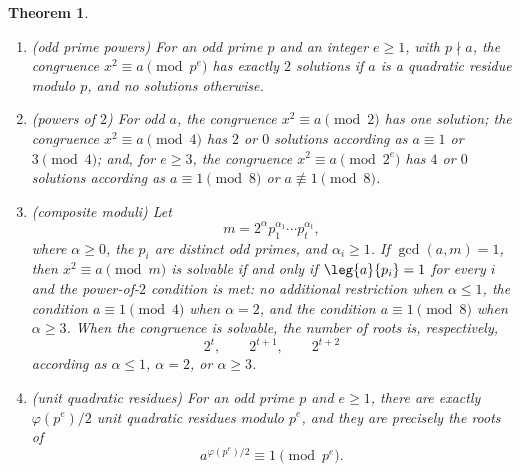 \documentclass[11pt]{article}
\theoremstyle{ntstyle}
\newtheorem{theorem}{Theorem}[subsection]
\newcommand{\statementitems}{\mbox{}}
\begin{document}
\begin{theorem}\label{thm:7.8.4}\statementitems

	\begin{enumerate}[label={\alph*)}]
		\item (odd prime powers) For an odd prime $p$ and an integer $e\ge1$,
		      with $p\nmid a$, the congruence
		      $x^2\equiv a\pmod{p^e}$ has exactly $2$ solutions if $a$ is a
		      quadratic residue modulo $p$, and no solutions otherwise.
		\item (powers of $2$) For odd $a$, the congruence
		      $x^2\equiv a\pmod2$ has one solution;
		      the congruence $x^2\equiv a\pmod4$ has $2$ or $0$ solutions according as
		      $a\equiv1$ or $3\pmod4$; and, for $e\ge3$,
		      the congruence $x^2\equiv a\pmod{2^e}$ has $4$ or $0$ solutions according as
		      $a\equiv1\pmod8$ or $a\not\equiv1\pmod8$.
		\item (composite moduli) Let
		      \[
			      m=2^\alpha p_1^{\alpha_1}\cdots p_t^{\alpha_t},
		      \]
		      where $\alpha\ge0$, the $p_i$ are distinct odd primes, and
		      $\alpha_i\ge1$. If $\gcd(a,m)=1$, then
		      $x^2\equiv a\pmod m$ is solvable if and only if
		      $\leg{a}{p_i}=1$ for every $i$ and the power-of-$2$ condition is met:
		      no additional restriction when $\alpha\le1$,
		      the condition $a\equiv1\pmod4$ when $\alpha=2$, and
		      the condition $a\equiv1\pmod8$ when $\alpha\ge3$. When the congruence is solvable, the number
		      of roots is, respectively,
		      \[
			      2^t,\qquad 2^{t+1},\qquad 2^{t+2}
		      \]
		      according as $\alpha\le1$, $\alpha=2$, or $\alpha\ge3$.
		\item (unit quadratic residues) For an odd prime $p$ and
		      $e\ge1$, there are exactly $\varphi(p^e)/2$ unit quadratic
		      residues modulo $p^e$, and they are precisely the roots of
		      \[
			      a^{\varphi(p^e)/2}\equiv1\pmod{p^e}.
		      \]
	\end{enumerate}

\end{theorem}
\end{document}
